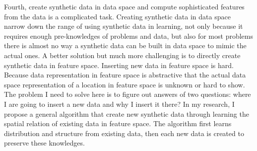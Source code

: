 \documentclass{iitthesis}
\begin{document}
Fourth, create synthetic data in data space and compute sophisticated features from the data is a complicated task. Creating synthetic data in data space narrow down the range of using synthetic data in learning, not only because it requires enough pre-knowledges of problems and data, but also for most problems there is almost no way a synthetic data can be built in data space to mimic the actual ones. A better solution but much more challenging is to directly create synthetic data in feature space. Inserting new data in feature space is hard. Because data representation in feature space is abstractive that the actual data space representation of a location in feature space is unknown or hard to show. The problem I need to solve here is to figure out answers of two questions: where I are going to insert a new data and why I insert it there? In my research, I propose a general algorithm that create new synthetic data through learning the spatial relation of existing data in feature space. The algorithm first learns distribution and structure from existing data, then each new
data is created to preserve these knowledges.



\clearpage


%
%
%
%
%
%
%
%
%


 

\end{document}

